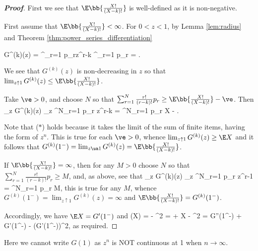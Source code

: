 \begin{proof}[\bf Proof]%
First we see that $\E\bb{\frac{X!}{(X-k)!}}$ is well-defined as it is non-negative.

First assume that $\E\bb{\frac{X!}{(X-k)!}} < \infty$. For $0 < z < 1$, by Lemma \ref{lem:radius} and Theorem \ref{thm:power_series_differentiation}

\be
G^{(k)}(z) = \sum^\infty_{r=1} p_rz^{r-k} \leq \sum^\infty_{r=1}  p_r = \E{}.
\ee

We see that $G^{(k)}(z)$ is non-decreasing in $z$ so that $\lim_{z\uparrow 1} G^{(k)}(z) \leq \E\bb{\frac{X!}{(X-k)!}}$.

Take $\ve > 0$, and choose $N$ so that $\sum^N_{r=1} \frac{r!}{(r-k)!} p_r \geq \E\bb{\frac{X!}{(X-k)!}} -\ve$. Then
\be
\lim_{z} G^{(k)}(z) \geq \lim_{z} \sum^N_{r=1}  p_r z^{r-k} = \sum^N_{r=1}  p_r \geq \E X - \ve.
\ee

Note that ($*$) holds because it takes the limit of the sum of finite items, having the form of $z^n$. This is true for each $\ve > 0$, whence $\lim_{z\uparrow 1} G^{(k)}(z) \geq \E X$ and it follows that $G^{(k)}(1^-) = \lim_{z\ua 1} G^{(k)}(z) = \E\bb{\frac{X!}{(X-k)!}}$.

If $\E\bb{\frac{X!}{(X-k)!}} = \infty$, then for any $M > 0$ choose $N$ so that $\sum^N_{r=1} \frac{r!}{(r-k)!} p_r \geq M$, and, as above, see that
\be
\lim_{z} G^{(k)}(z) \geq \lim_{z} \sum^N_{r=1}  p_r z^{r-1} = \sum^N_{r=1}  p_r \geq M,
\ee
this is true for any $M$, whence $G^{(k)}(1^-) = \lim_{z\uparrow 1} G^{(k)}(z) = \infty$ and $\E\bb{\frac{X!}{(X-k)!}} = G^{(k)}(1^-)$.

Accordingly, we have $\E X = G'(1^-)$ and
\be
\var(X) = \E{} - ^2 = \E{} + \E X - ^2 = G''(1^-) + G'(1^-) - (G'(1^-))^2,
\ee
as required.
\end{proof}


\begin{remark}
Here we cannot write $G(1)$ as $z^{n}$ is NOT continuous at 1 when $n\to \infty$.
\end{remark}



